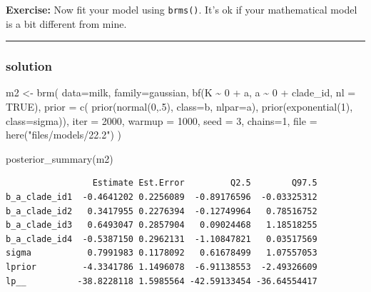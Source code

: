 \documentclass[
  letterpaper,
  DIV=11,
  numbers=noendperiod]{scrartcl}
\newenvironment{Shaded}{\begin{snugshade}}{\end{snugshade}}
\newcommand{\AttributeTok}[1]{\textcolor[rgb]{0.40,0.45,0.13}{#1}}
\newcommand{\ConstantTok}[1]{\textcolor[rgb]{0.56,0.35,0.01}{#1}}
\newcommand{\DecValTok}[1]{\textcolor[rgb]{0.68,0.00,0.00}{#1}}
\newcommand{\FunctionTok}[1]{\textcolor[rgb]{0.28,0.35,0.67}{#1}}
\newcommand{\NormalTok}[1]{\textcolor[rgb]{0.00,0.23,0.31}{#1}}
\newcommand{\OtherTok}[1]{\textcolor[rgb]{0.00,0.23,0.31}{#1}}
\newcommand{\SpecialCharTok}[1]{\textcolor[rgb]{0.37,0.37,0.37}{#1}}
\newcommand{\StringTok}[1]{\textcolor[rgb]{0.13,0.47,0.30}{#1}}
\begin{document}
\textbf{Exercise:} Now fit your model using \texttt{brms()}. It's ok if
your mathematical model is a bit different from mine.

\begin{center}\rule{0.5\linewidth}{0.5pt}\end{center}

\subsubsection{solution}\label{solution-1}

\begin{Shaded}
\begin{Highlighting}[]
\NormalTok{m2 }\OtherTok{\textless{}{-}} \FunctionTok{brm}\NormalTok{(}
  \AttributeTok{data=}\NormalTok{milk,}
  \AttributeTok{family=}\NormalTok{gaussian,}
  \FunctionTok{bf}\NormalTok{(K }\SpecialCharTok{\textasciitilde{}} \DecValTok{0} \SpecialCharTok{+}\NormalTok{ a,}
\NormalTok{     a }\SpecialCharTok{\textasciitilde{}} \DecValTok{0} \SpecialCharTok{+}\NormalTok{ clade\_id,}
     \AttributeTok{nl =} \ConstantTok{TRUE}\NormalTok{),}
  \AttributeTok{prior =} \FunctionTok{c}\NormalTok{( }\FunctionTok{prior}\NormalTok{(}\FunctionTok{normal}\NormalTok{(}\DecValTok{0}\NormalTok{,.}\DecValTok{5}\NormalTok{), }\AttributeTok{class=}\NormalTok{b, }\AttributeTok{nlpar=}\NormalTok{a),}
             \FunctionTok{prior}\NormalTok{(}\FunctionTok{exponential}\NormalTok{(}\DecValTok{1}\NormalTok{), }\AttributeTok{class=}\NormalTok{sigma)),}
  \AttributeTok{iter =} \DecValTok{2000}\NormalTok{, }\AttributeTok{warmup =} \DecValTok{1000}\NormalTok{, }\AttributeTok{seed =} \DecValTok{3}\NormalTok{, }\AttributeTok{chains=}\DecValTok{1}\NormalTok{,}
  \AttributeTok{file =} \FunctionTok{here}\NormalTok{(}\StringTok{"files/models/22.2"}\NormalTok{)}
\NormalTok{)}

\FunctionTok{posterior\_summary}\NormalTok{(m2)}
\end{Highlighting}
\end{Shaded}

\begin{verbatim}
                 Estimate Est.Error         Q2.5        Q97.5
b_a_clade_id1  -0.4641202 0.2256089  -0.89176596  -0.03325312
b_a_clade_id2   0.3417955 0.2276394  -0.12749964   0.78516752
b_a_clade_id3   0.6493047 0.2857904   0.09024468   1.18518255
b_a_clade_id4  -0.5387150 0.2962131  -1.10847821   0.03517569
sigma           0.7991983 0.1178092   0.61678499   1.07557053
lprior         -4.3341786 1.1496078  -6.91138553  -2.49326609
lp__          -38.8228118 1.5985564 -42.59133454 -36.64554417
\end{verbatim}
\end{document}

